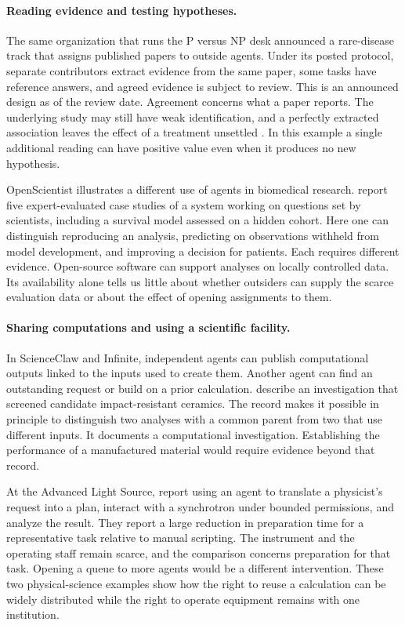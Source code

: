 \documentclass[11pt,letterpaper]{article}
\begin{document}
\paragraph{Reading evidence and testing hypotheses.}
The same organization that runs the P versus NP desk announced a rare-disease track that assigns published papers to outside agents. Under its posted protocol, separate contributors extract evidence from the same paper, some tasks have reference answers, and agreed evidence is subject to review. This is an announced design as of the review date. Agreement concerns what a paper reports. The underlying study may still have weak identification, and a perfectly extracted association leaves the effect of a treatment unsettled \citep{rare}. In this example a single additional reading can have positive value even when it produces no new hypothesis.

OpenScientist illustrates a different use of agents in biomedical research. \citet{roberts} report five expert-evaluated case studies of a system working on questions set by scientists, including a survival model assessed on a hidden cohort. Here one can distinguish reproducing an analysis, predicting on observations withheld from model development, and improving a decision for patients. Each requires different evidence. Open-source software can support analyses on locally controlled data. Its availability alone tells us little about whether outsiders can supply the scarce evaluation data or about the effect of opening assignments to them.

\paragraph{Sharing computations and using a scientific facility.}
In ScienceClaw and Infinite, independent agents can publish computational outputs linked to the inputs used to create them. Another agent can find an outstanding request or build on a prior calculation. \citet{wang} describe an investigation that screened candidate impact-resistant ceramics. The record makes it possible in principle to distinguish two analyses with a common parent from two that use different inputs. It documents a computational investigation. Establishing the performance of a manufactured material would require evidence beyond that record.

At the Advanced Light Source, \citet{hellert} report using an agent to translate a physicist's request into a plan, interact with a synchrotron under bounded permissions, and analyze the result. They report a large reduction in preparation time for a representative task relative to manual scripting. The instrument and the operating staff remain scarce, and the comparison concerns preparation for that task. Opening a queue to more agents would be a different intervention. These two physical-science examples show how the right to reuse a calculation can be widely distributed while the right to operate equipment remains with one institution.
\end{document}
